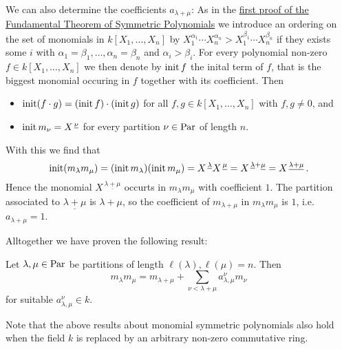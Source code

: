 \begin{fluff}
  We can also determine the coefficients $a_{\lambda + \mu}$:
  As in the \hyperref[label: first proof of fundamental theorem]{first proof of the Fundamental Theorem of Symmetric Polynomials} we introduce an ordering on the set of monomials in $k[X_1, \dotsc, X_n]$ by $X_1^{\alpha_1} \dotsm X_n^{\alpha_n} > X_1^{\beta_1} \dotsm X_n^{\beta_n}$ if they exists some $i$ with $\alpha_1 = \beta_1, \dotsc, \alpha_n = \beta_n$ and $\alpha_i > \beta_i$.
  For every polynomial non-zero $f \in k[X_1, \dotsc, X_n]$ we then denote by $\operatorname{init} f$ the inital term of $f$, that is the biggest monomial occuring in $f$ together with its coefficient.
  Then
  \begin{itemize}
    \item
      $\operatorname{init}(f \cdot g) = (\operatorname{init} f) \cdot (\operatorname{init} g)$ for all $f, g \in k[X_1, \dotsc, X_n]$ with $f, g \neq 0$, and
    \item
      $\operatorname{init} m_\nu = X^{\,\underline{\nu}}$ for every partition $\nu \in \operatorname{Par}$ of length $n$.
  \end{itemize}
  With this we find that
  \[
      \operatorname{init}(m_\lambda m_\mu)
    = (\operatorname{init} m_\lambda) (\operatorname{init} m_\mu)
    = X^{\,\underline{\lambda}} X^{\,\underline{\mu}}
    = X^{\,\underline{\lambda} + \underline{\mu}}
    = X^{\,\underline{\lambda + \mu}} \,.
  \]
  Hence the monomial $X^{\,\underline{\lambda + \mu}}$ occurts in $m_\lambda m_\mu$ with coefficient $1$.
  The partition associated to $\underline{\lambda + \mu}$ is $\lambda + \mu$, so the coefficient of $m_{\lambda + \mu}$ in $m_\lambda m_\mu$ is $1$, i.e.\ $a_{\lambda + \mu} = 1$.
  
  Alltogether we have proven the following result:
\end{fluff}


\begin{lemma}
  Let $\lambda, \mu \in \operatorname{Par}$ be partitions of length $\ell(\lambda), \ell(\mu) = n$.
  Then
  \[
        m_{\lambda} m_{\mu}
    =   m_{\lambda + \mu}
      + \sum_{\nu < \lambda + \mu} a^\nu_{\lambda,\mu} m_\nu
  \]
  for suitable $a^\nu_{\lambda,\mu} \in k$.
\end{lemma}


\begin{remark}
  Note that the above results about monomial symmetric polynomials also hold when the field $k$ is replaced by an arbitrary non-zero commutative ring.
\end{remark}






